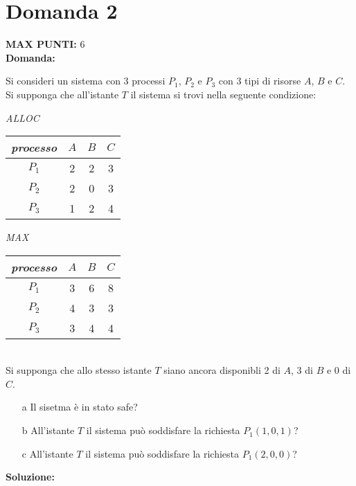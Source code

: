 \documentclass{article}
\begin{document}
   \section*{Domanda 2}
   \textbf{MAX PUNTI:} 6\\
   \textbf{Domanda:}


   Si consideri un sistema con 3 processi $P_1$, $P_2$ e $P_3$ con 3 tipi di risorse $A$, $B$ e $C$.\\
   Si supponga che all'istante $T$ il sistema si trovi nella seguente condizione:


   \begin{minipage}[c]{0.5\textwidth}
      \emph{ALLOC}\\
      \begin{tabular}{|c|c|c|c|}
         \hline
         \emph{processo} & $A$ & $B$ & $C$\\
         \hline
         $P_1$ & 2 & 2 & 3\\
         \hline
         $P_2$ & 2 & 0 & 3\\
         \hline
         $P_3$ & 1 & 2 & 4\\
         \hline 
      \end{tabular}
   \end{minipage}
   \begin{minipage}[c]{0.5\textwidth}
      \emph{MAX}\\
      \begin{tabular}{|c|c|c|c|}
         \hline
         \emph{processo} & $A$ & $B$ & $C$\\
         \hline
         $P_1$ & 3 & 6 & 8\\
         \hline
         $P_2$ & 4 & 3 & 3\\
         \hline
         $P_3$ & 3 & 4 & 4\\
         \hline 
      \end{tabular}
   \end{minipage}\\
   Si supponga che allo stesso istante $T$ siano ancora disponibli 2 di $A$, 3 di $B$ e 0 di $C$.
   \begin{itemize}
      \item[a] Il sisetma è in stato safe?
      \item[b] All'istante $T$ il sistema può soddisfare la richiesta $P_1(1,0,1)$?
      \item[c] All'istante $T$ il sistema può soddisfare la richiesta $P_1(2,0,0)$?
   \end{itemize}
   \textbf{Soluzione:}
\end{document}
